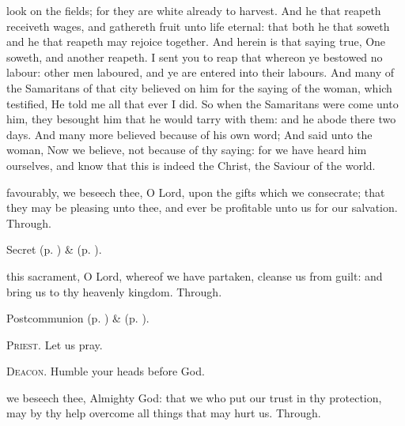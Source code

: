 look on the fields; for they are white already to harvest. And he that reapeth receiveth wages, and gathereth fruit unto life eternal: that both he that soweth and he that reapeth may rejoice together. And herein is that saying true, One soweth, and another reapeth. I sent you to reap that whereon ye bestowed no labour: other men laboured, and ye are entered into their labours. And many of the Samaritans of that city believed on him for the saying of the woman, which testified, He told me all that ever I did. So when the Samaritans were come unto him, they besought him that he would tarry with them: and he abode there two days. And many more believed because of his own word; And said unto the woman, Now we believe, not because of thy saying: for we have heard him ourselves, and know that this is indeed the Christ, the Saviour of the world.


\secret
{} favourably, we beseech thee, O Lord, upon the gifts which we consecrate; that they may be pleasing unto thee, and ever be profitable unto us for our salvation. Through.

\begin{rubric}
     Secret  (p. \pageref{AshWednesdayMassSecret}) \&   (p. \pageref{SPLivingDeparted}).
\end{rubric}


\clearpage
\postcommunion
{} this sacrament, O Lord, whereof we have partaken, cleanse us from guilt: and bring us to thy heavenly kingdom. Through.


\begin{rubric}
     Postcommunion  (p. \pageref{AshWednesdayMassPostcommunion}) \&   (p. \pageref{SPLivingDeparted}).
\end{rubric}

\textsc{Priest.} Let us pray.\par
\textsc{Deacon.} Humble your heads before God.\par
{} we beseech thee, Almighty God: that we who put our trust in thy protection, may by thy help overcome all things that may hurt us. Through.


